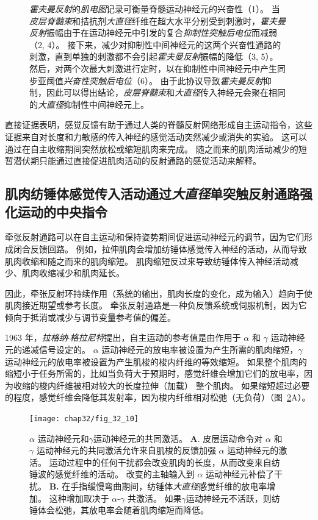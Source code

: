 \begin{figure}[htbp]
{	\textit{霍夫曼反射}的\textit{肌电图}记录可衡量脊髓运动神经元的兴奋性（1）。
	当\textit{皮层脊髓束}和拮抗剂\textit{大直径}纤维在超大水平分别受到刺激时，\textit{霍夫曼反射}振幅由于在运动神经元中引发的复合\textit{抑制性突触后电位}而减弱（2, 4）。
	接下来，减少对抑制性中间神经元的这两个兴奋性通路的刺激，直到单独的刺激都不会引起\textit{霍夫曼反射}振幅的降低（3, 5）。
	然后，对两个次最大刺激进行定时，以在抑制性中间神经元中产生同步亚阈值\textit{兴奋性突触后电位}（6）。
	由于此协议导致\textit{霍夫曼反射}抑制，因此可以得出结论，\textit{皮层脊髓束}和\textit{大直径}传入神经元会聚在相同的\textit{大直径}抑制性中间神经元上。}
	\label{fig:32_9}
\end{figure}


直接证据表明，感觉反馈有助于通过人类的脊髓反射网络形成自主运动指令，这些证据来自对长度和力敏感的传入神经的感觉活动突然减少或消失的实验。
这可以通过在自主收缩期间突然放松或缩短肌肉来完成。
随之而来的肌肉活动减少的短暂潜伏期只能通过直接促进肌肉活动的反射通路的感觉活动来解释。



\subsection{肌肉纺锤体感觉传入活动通过\textit{大直径}单突触反射通路强化运动的中央指令}

牵张反射通路可以在自主运动和保持姿势期间促进运动神经元的调节，因为它们形成闭合反馈回路。
例如，拉伸肌肉会增加纺锤体感觉传入神经的活动，从而导致肌肉收缩和随之而来的肌肉缩短。
肌肉缩短反过来导致纺锤体传入神经活动减少、肌肉收缩减少和肌肉延长。


因此，牵张反射环持续作用（系统的输出，肌肉长度的变化，成为输入）趋向于使肌肉接近期望或参考长度。
牵张反射通路是一种负反馈系统或伺服机制，因为它倾向于抵消或减少与调节变量参考值的偏差。


1963 年，\textit{拉格纳$\cdot$格拉尼特}提出，自主运动的参考值是由作用于 $ \alpha $ 和 $ \gamma $ 运动神经元的递减信号设定的。
$ \alpha $ 运动神经元的放电率被设置为产生所需的肌肉缩短，$ \gamma $ 运动神经元的放电率被设置为产生肌梭的梭内纤维的等效缩短。
如果整个肌肉的缩短小于任务所需的，比如当负荷大于预期时，感觉纤维会增加它们的放电率，因为收缩的梭内纤维被相对较大的长度拉伸（加载） 整个肌肉。
如果缩短超过必要的程度，感觉纤维会降低其发射率，因为梭内纤维相对松弛（无负荷）（图~\ref{fig:32_10}A）。


\begin{figure}[htbp]
	\centering
	\texttt{[image: chap32/fig\_32\_10]}
	\caption{$ \alpha $ 运动神经元和$ \gamma $运动神经元的共同激活。
	\textbf{A}. 皮层运动命令对 $ \alpha $ 和 $ \gamma $ 运动神经元的共同激活允许来自肌梭的反馈加强 $ \alpha $ 运动神经元的激活。
	运动过程中的任何干扰都会改变肌肉的长度，从而改变来自纺锤波的感觉纤维的活动。
	改变的主轴输入到 $ \alpha $ 运动神经元补偿了干扰。
	\textbf{B.} 在手指缓慢弯曲期间，纺锤体\textit{大直径}感觉纤维的放电率增加。
	这种增加取决于 $ \alpha $-$ \gamma $ 共激活。
	如果$ \gamma $运动神经元不活跃，则纺锤体会松弛，其放电率会随着肌肉缩短而降低\cite{vallbo1981basic}。}
	\label{fig:32_10}
\end{figure}


